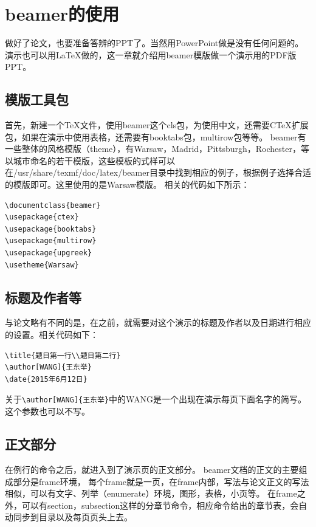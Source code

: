 \chapter{beamer的使用}


做好了论文，也要准备答辨的PPT了。当然用PowerPoint做是没有任何问题的。
演示也可以用\LaTeX{}做的，这一章就介绍用beamer模版做一个演示用的PDF版PPT。

\section{模版工具包}

首先，新建一个\TeX{}文件，使用beamer这个cls包，为使用中文，还需要CTeX扩展包，如果在演示中使用表格，还需要有booktabs包，multirow包等等。
beamer有一些整体的风格模版（theme），有Warsaw，Madrid，Pittsburgh，Rochester，等以城市命名的若干模版，这些模板的式样可以在/usr/share/texmf/doc/latex/beamer目录中找到相应的例子，根据例子选择合适的模版即可。这里使用的是Warsaw模版。
相关的代码如下所示：

{
\linespread{1}
\noindent
\begin{verbatim}
\documentclass{beamer}
\usepackage{ctex}
\usepackage{booktabs}
\usepackage{multirow}
\usepackage{upgreek}
\usetheme{Warsaw}
\end{verbatim}
}

\section{标题及作者等}

与论文略有不同的是，在\verb++之前，就需要对这个演示的标题及作者以及日期进行相应的设置。相关代码如下：

{
\linespread{1}
\noindent
\begin{verbatim}
\title{题目第一行\\题目第二行}
\author[WANG]{王东举}
\date{2015年6月12日}
\end{verbatim}
}

关于\verb|\author[WANG]{王东举}|中的WANG是一个出现在演示每页下面名字的简写。这个参数也可以不写。

\section{正文部分}

在例行的\verb||命令之后，就进入到了演示页的正文部分。
beamer文档的正文的主要组成部分是frame环境，
每个frame就是一页，在frame内部，写法与论文正文的写法相似，可以有文字、列举（enumerate）环境，图形，表格，小页等。
在frame之外，可以有section，subsection这样的分章节命令，相应命令给出的章节表，会自动同步到目录以及每页页头上去。

